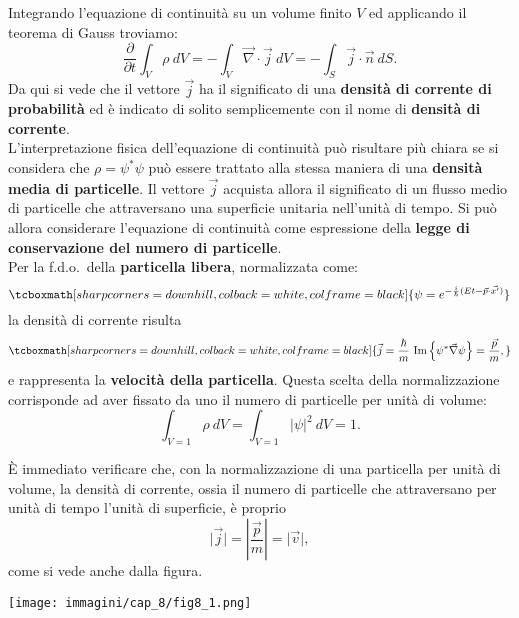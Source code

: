 Integrando l'equazione di continuità su un volume finito $V$ ed applicando il teorema di Gauss troviamo:
\begin{equation}
\frac{\partial }{\partial t} \int _V \rho\ dV = - \int _V \vec{\nabla}\cdot\vec{j}\ dV = -\int _S \vec{j}\cdot\vec{n}\ dS.
\end{equation}
Da qui si vede che il vettore $\vec{j}$ ha il significato di una \textbf{densità di corrente di probabilità} ed è indicato di solito semplicemente con il nome di \textbf{densità di corrente}.\\

L'interpretazione fisica dell'equazione di continuità può risultare più chiara se si considera che $\rho= \psi^* \psi$ può essere trattato alla stessa maniera di una \textbf{densità media di particelle}. Il vettore $\vec{j}$ acquista allora il significato di un flusso medio di particelle che attraversano una superficie unitaria nell'unità di tempo. Si può allora considerare l'equazione di continuità come espressione della \textbf{legge di conservazione del numero di particelle}.\\

Per la f.d.o.~della \textbf{particella libera}, normalizzata come:
	\begin{equation}
		\tcboxmath[sharp corners=downhill, colback=white, colframe=black]{
			\psi  =  e^{-\frac{i}{\hbar} (Et - \vec{p}\cdot \vec{x'})}
			}
	\end{equation}
la densità di corrente risulta
	\begin{equation}
		\tcboxmath[sharp corners=downhill, colback=white, colframe=black]{
			\vec{j}= \frac{\hbar}{m}\ \textrm{Im}\left\{\psi ^* \vec{\nabla}\psi \right\}= \frac{\vec{p}}{m},
			}
	\end{equation}
e rappresenta la \textbf{velocità della particella}. Questa scelta della normalizzazione corrisponde ad aver fissato da uno il numero di particelle per unità di volume:
	\begin{equation}
		\int _{V=1} \rho \ dV = \int _{V=1} \vert \psi \vert ^2 \ dV=1.
	\end{equation}
\begin{center}
\begin{tcolorbox}[toprule=3mm, width=.9\textwidth, colback=white]
È immediato verificare che, con la normalizzazione di una particella per unità di volume, la densità di corrente, ossia il numero di particelle che attraversano per unità di tempo l'unità di superficie, è proprio
\begin{equation}
\vert \vec{j} \vert= \left\vert \frac{\vec{p}}{m} \right\vert =\vert \vec{v} \vert ,
\end{equation}
come si vede anche dalla figura.
\begin{center}
\texttt{[image: immagini/cap\_8/fig8\_1.png]}
\end{center}
\end{tcolorbox}
\end{center}

